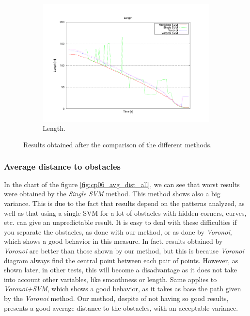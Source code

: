 \begin{figure}
  \ContinuedFloat
  \begin{subfigure}[b]{\textwidth}
	  \centering
	  \includegraphics[width=\textwidth,height=0.5\textwidth, trim=55 50 85 60,clip]{figure13}
	  \caption{Length.}
	  \label{fig:cp06_length_all}
  \end{subfigure}
  
  \caption{Results obtained after the comparison of the different methods.}\label{fig:cp06_results_comparison}
\end{figure}

\subsubsection{Average distance to obstacles}\label{ch:chapter06_02_02_01}

In the chart of the figure \ref{fig:cp06_avg_dist_all}, we can see that worst results were obtained by the \textit{Single \ac{SVM}} method. This method shows also a big variance. This is due to the fact that results depend on the patterns analyzed, as well as that using a single \ac{SVM} for a lot of obstacles with hidden corners, curves, etc. can give an unpredictable result. It is easy to deal with these difficulties if you separate the obstacles, as done with our method, or as done by \textit{Voronoi}, which shows a good behavior in this measure. In fact, results obtained by \textit{Voronoi} are better than those shown by our method, but this is because \textit{Voronoi} diagram always find the central point between each pair of points. However, as shown later, in other tests, this will become a disadvantage as it does not take into account other variables, like smoothness or length. Same applies to \textit{Voronoi+\ac{SVM}}, which shows a good behavior, as it takes as base the path given by the \textit{Voronoi} method.
Our method, despite of not having so good results, presents a good average distance to the obstacles, with an acceptable variance.

